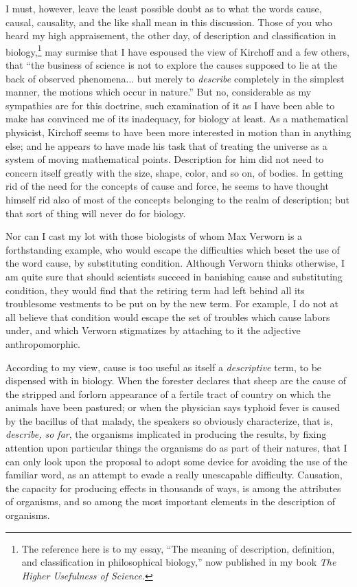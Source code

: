 \documentclass[a4paper, 11pt, oneside, polutonikogreek, english, landscape]{article}
\begin{document}
I must, however, leave the least possible doubt as to what the words cause, causal, causality, and the like shall mean in this discussion. Those of you who heard my high appraisement, the other day, of description and classification in biology,\footnote{The reference here is to my essay, ``The meaning of description, definition, and classification in philosophical biology,'' now published in my book \emph{The Higher Usefulness of Science}.} may surmise that I have espoused the view of Kirchoff and a few others, that ``the business of science is not to explore the causes supposed to lie at the back of observed phenomena... but merely to \emph{describe} completely in the simplest manner, the motions which occur in nature.'' But no, considerable as my sympathies are for this doctrine, such examination of it as I have been able to make has convinced me of its inadequacy, for biology at least. As a mathematical physicist, Kirchoff seems to have been more interested in motion than in anything else; and he appears to have made his task that of treating the universe as a system of moving mathematical points. Description for him did not need to concern itself greatly with the size, shape, color, and so on, of bodies. In getting rid of the need for the concepts of cause and force, he seems to have thought himself rid also of most of the concepts belonging to the realm of description; but that sort of thing will never do for biology.

Nor can I cast my lot with those biologists of whom Max Verworn is a forthstanding example, who would escape the difficulties which beset the use of the word cause, by substituting condition. Although Verworn thinks otherwise, I am quite sure that should scientists succeed in banishing cause and substituting condition, they would find that the retiring term had left behind all its troublesome vestments to be put on by the new term. For example, I do not at all believe that condition would escape the set of troubles which cause labors under, and which Verworn stigmatizes by attaching to it the adjective anthropomorphic.

According to my view, cause is too useful as itself a \emph{descriptive} term, to be dispensed with in biology. When the forester declares that sheep are the cause of the stripped and forlorn appearance of a fertile tract of country on which the animals have been pastured; or when the physician says typhoid fever is caused by the bacillus of that malady, the speakers so obviously characterize, that is, \emph{describe, so far}, the organisms implicated in producing the results, by fixing attention upon particular things the organisms do as part of their natures, that I can only look upon the proposal to adopt some device for avoiding the use of the familiar word, as an attempt to evade a really unescapable difficulty. Causation, the capacity for producing effects in thousands of ways, is among the attributes of organisms, and so among the most important elements in the description of organisms.
\end{document}
